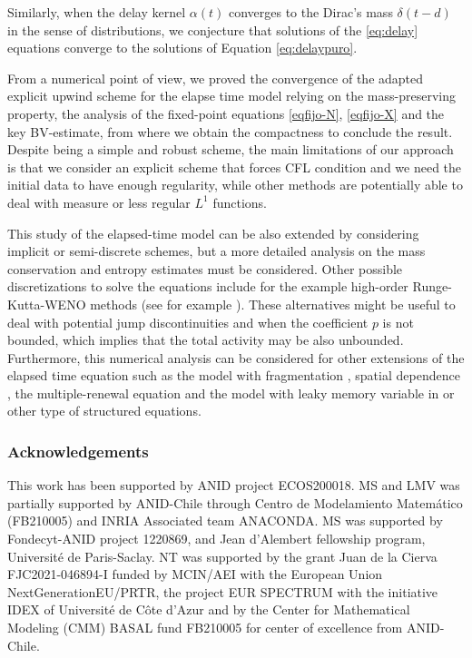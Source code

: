 \documentclass[11pt,a4paper]{article}
\begin{document}
Similarly, when the delay kernel $\alpha(t)$ converges to the Dirac's mass $\delta(t-d)$ in the sense of distributions, we conjecture that solutions of the \eqref{eq:delay} equations converge to the solutions of Equation \eqref{eq:delaypuro}. 

From a numerical point of view, we proved the convergence of the adapted explicit upwind scheme for the elapse time model relying on the mass-preserving property, the analysis of the fixed-point equations \eqref{eqfijo-N}, \eqref{eqfijo-X} and the key BV-estimate, from where we obtain the compactness to conclude the result. Despite being a simple and robust scheme, the main limitations of our approach is that we consider an explicit scheme that forces CFL condition and we need the initial data to have enough regularity, while other methods are potentially able to deal with measure or less regular $L^1$ functions.

This study of the elapsed-time model can be also extended by considering implicit or semi-discrete schemes, but a more detailed analysis on the mass conservation and entropy estimates must be considered. Other possible discretizations to solve the equations include for the example high-order Runge-Kutta-WENO methods (see for example \cite{leveque1992numerical,godlewski1996numerical,cockburn1998essentially,bouchut2004nonlinear}). These alternatives might be useful to deal with potential jump discontinuities and when the coefficient $p$ is not bounded, which implies that the total activity may be also unbounded. Furthermore, this numerical analysis can be considered for other extensions of the elapsed time equation such as the model with fragmentation \cite{pakdaman2014adaptation}, spatial dependence \cite{torres2020dynamics,dumont2024oscillations}, the multiple-renewal equation \cite{torres2022multiple} and the model with leaky memory variable in \cite{fonte2022long} or other type of structured equations.

\subsubsection*{Acknowledgements}
This work has been supported by ANID project ECOS200018. MS and LMV was partially supported by ANID-Chile through Centro de Modelamiento  Matem\'atico  (FB210005) and INRIA Associated team ANACONDA. 
MS was supported by  Fondecyt-ANID project 1220869, and Jean d'Alembert fellowship program, Université de Paris-Saclay.
NT was supported by the grant Juan de la Cierva FJC2021-046894-I funded by MCIN/AEI with the European Union NextGenerationEU/PRTR, the project EUR SPECTRUM with the initiative IDEX of Université de Côte d'Azur and by the Center for Mathematical Modeling (CMM) BASAL fund FB210005 for center of excellence from ANID-Chile.
\end{document}
